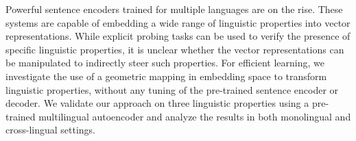 Powerful sentence encoders trained for multiple languages are on the rise. These systems are capable of embedding a wide range of linguistic properties into vector representations. While explicit probing tasks can be used to verify the presence of specific linguistic properties, it is unclear whether the vector representations can be manipulated to indirectly steer such properties. For efficient learning, we investigate the use of a geometric mapping in embedding space to transform linguistic properties, without any tuning of the pre-trained sentence encoder or decoder. We validate our approach on three linguistic properties using a pre-trained multilingual autoencoder and analyze the results in both monolingual and cross-lingual settings.
